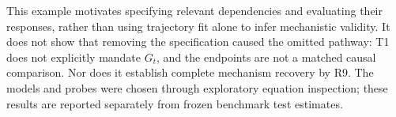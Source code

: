 This example motivates specifying relevant dependencies and evaluating their
responses, rather than using trajectory fit alone to infer mechanistic validity.
It does not show that removing the specification caused the omitted pathway:
T1 does not explicitly mandate $G_t$, and the endpoints are not a matched
causal comparison. Nor does it establish complete mechanism recovery by R9.
The models and probes were chosen through exploratory equation inspection;
these results are reported separately from frozen benchmark test estimates.
